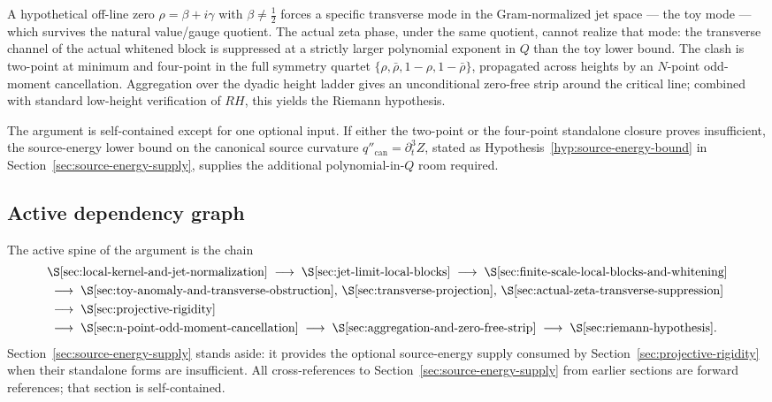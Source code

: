 \documentclass[11pt,a4paper]{amsart}
\def\RH{RH}%
\numberwithin{equation}{section}
\theoremstyle{plain}
\theoremstyle{definition}
\newcommand{\RH}{\mathrm{RH}}
\newcommand{\can}{\mathrm{can}}
\begin{document}
A hypothetical off-line zero \(\rho=\beta+i\gamma\) with
\(\beta\ne\tfrac12\) forces a specific transverse mode in the
Gram-normalized jet space --- the toy mode --- which survives the
natural value/gauge quotient.  The actual zeta phase, under the same quotient,
cannot realize that mode: the transverse channel of the actual whitened
block is suppressed at a strictly larger polynomial exponent in \(Q\)
than the toy lower bound.  The clash is two-point at minimum and four-point in the full symmetry quartet
\(\{\rho,\bar\rho,1-\rho,1-\bar\rho\}\), propagated across heights by
an \(N\)-point odd-moment cancellation.
Aggregation over the dyadic height ladder gives an unconditional
zero-free strip around the critical line; combined with standard
low-height verification of \(\RH\), this yields the Riemann hypothesis.

The argument is self-contained except for one optional input.  If either
the two-point or the four-point standalone closure proves insufficient,
the source-energy lower bound on the canonical source
curvature \(q''_\can=\partial_t^3 Z\), stated as
Hypothesis~\ref{hyp:source-energy-bound} in
Section~\ref{sec:source-energy-supply}, supplies the additional
polynomial-in-\(Q\) room required.

\subsection{Active dependency graph}
\label{subsec:active-dependency-graph}

The active spine of the argument is the chain
\[
\begin{aligned}
&\text{\S\ref{sec:local-kernel-and-jet-normalization}}
\;\longrightarrow\;
\text{\S\ref{sec:jet-limit-local-blocks}}
\;\longrightarrow\;
\text{\S\ref{sec:finite-scale-local-blocks-and-whitening}}\\
&\;\longrightarrow\;
\text{\S\ref{sec:toy-anomaly-and-transverse-obstruction},\
\S\ref{sec:transverse-projection},\
\S\ref{sec:actual-zeta-transverse-suppression}}\\
&\;\longrightarrow\;
\text{\S\ref{sec:projective-rigidity}}\\
&\;\longrightarrow\;
\text{\S\ref{sec:n-point-odd-moment-cancellation}}
\;\longrightarrow\;
\text{\S\ref{sec:aggregation-and-zero-free-strip}}
\;\longrightarrow\;
\text{\S\ref{sec:riemann-hypothesis}}.
\end{aligned}
\]
Section~\ref{sec:source-energy-supply} stands aside: it provides the
optional source-energy supply consumed by
Section~\ref{sec:projective-rigidity}
when their standalone forms are insufficient.  All cross-references to
Section~\ref{sec:source-energy-supply} from earlier sections are
forward references; that section is self-contained.
\end{document}
